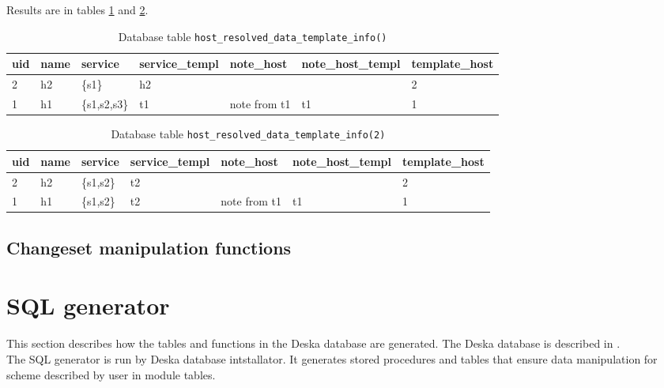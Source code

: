 \documentclass[deska]{subfiles}
\begin{document}
Results are in tables \ref{tab:multi-reshost} and \ref{tab:multi-reshostv2}.

\begin{longtable}{ l | l | l | l | l | l | l }
    \caption{Database table {\tt host\_resolved\_data\_template\_info()}}
    \label{tab:multi-reshost} \\
    uid &  name &  service &  service\_templ &  note\_host &  note\_host\_templ &  template\_host\\
    \hline
    \endhead
    2 & h2 & \{s1\} & h2 &  &  & 2\\
    1 & h1 & \{s1,s2,s3\} & t1 & note from t1 & t1 & 1\\
    \hline
\end{longtable}

\begin{longtable}{ l | l | l | l | l | l | l }
    \caption{Database table {\tt host\_resolved\_data\_template\_info(2)}}
    \label{tab:multi-reshostv2} \\
    uid &  name &  service &  service\_templ &  note\_host &  note\_host\_templ &  template\_host\\
    \hline
    \endhead
    2 & h2 & \{s1,s2\} & t2 &  &  & 2\\
    1 & h1 & \{s1,s2\} & t2 & note from t1 & t1 & 1\\
    \hline
\end{longtable}



\begin{abstract}
\end{abstract}

\label{sec:sql-procedures}

\subsection{Changeset manipulation functions}

\section{SQL generator}
\label{sec:sql-generator}
This section describes how the tables and functions in the Deska database are generated. The Deska database is described in .\\
The SQL generator is run by Deska database intstallator. It generates stored procedures and tables that ensure data manipulation for scheme described by user in module tables.\\
\end{document}
